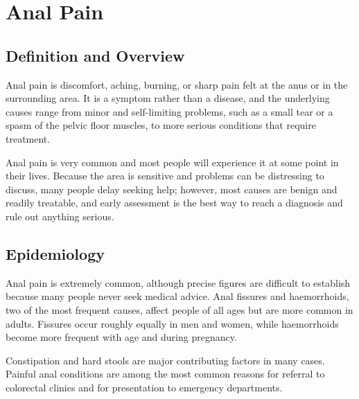 \chapter{Anal Pain}

\section*{Definition and Overview}
Anal pain is discomfort, aching, burning, or sharp pain felt at the anus or in the surrounding area. It is a symptom rather than a disease, and the underlying causes range from minor and self-limiting problems, such as a small tear or a spasm of the pelvic floor muscles, to more serious conditions that require treatment.

Anal pain is very common and most people will experience it at some point in their lives. Because the area is sensitive and problems can be distressing to discuss, many people delay seeking help; however, most causes are benign and readily treatable, and early assessment is the best way to reach a diagnosis and rule out anything serious.

\section*{Epidemiology}
Anal pain is extremely common, although precise figures are difficult to establish because many people never seek medical advice. Anal fissures and haemorrhoids, two of the most frequent causes, affect people of all ages but are more common in adults. Fissures occur roughly equally in men and women, while haemorrhoids become more frequent with age and during pregnancy.

Constipation and hard stools are major contributing factors in many cases. Painful anal conditions are among the most common reasons for referral to colorectal clinics and for presentation to emergency departments.

